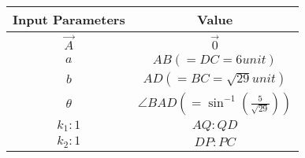 \begin{tabular}{|c|c|}
\hline
    \textbf{Input Parameters} &\textbf{Value} \\
    \hline
     $\vec{A}$&$\vec{0}$\\
     \hline
     $a$&$AB (= DC = 6 unit)$\\
     \hline
     $b$&$AD(= BC = \sqrt{29} unit)$\\
     \hline
     $\theta$& $\angle BAD(= \sin^{-1}(\frac{5}{\sqrt{29}}))$\\
     \hline
      $k_1:1$& $AQ:QD$\\
     \hline  
      $k_2:1$& $DP:PC$\\
     \hline  
\end{tabular}
